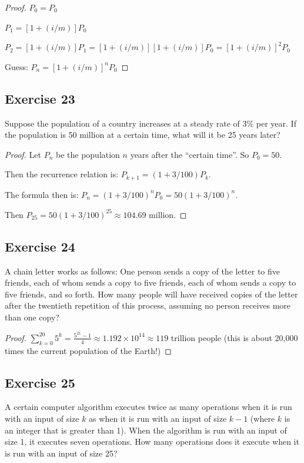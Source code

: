 \documentclass[14pt]{extarticle}
\newcommand{\dps}{\displaystyle}
\begin{document}
\begin{proof}
\(P_0 = P_0\)

\(P_1 = [1 + (i/m)] P_0\)

\(P_2 = [1 + (i/m)] P_1 = [1 + (i/m)][1 + (i/m)] P_0 = [1 + (i/m)]^2 P_0\)

Guess: \(P_n = [1 + (i/m)]^n P_0\)
\end{proof}

\subsection{Exercise 23}
Suppose the population of a country increases at a steady rate of 3\% per year. If the population is 50 million at a 
certain time, what will it be 25 years later?

\begin{proof}
Let $P_n$ be the population $n$ years after the ``certain time''. So $P_0 = 50$.

Then the recurrence relation is: \(P_{k+1} = (1 + 3/100) P_k\).

The formula then is: \(P_n = (1 + 3/100)^n P_0 = 50(1+3/100)^n\).

Then \(P_{25} = 50(1+3/100)^{25} \approx 104.69\) million.
\end{proof}

\subsection{Exercise 24}
A chain letter works as follows: One person sends a copy of the letter to five friends, each of whom sends a copy to 
five friends, each of whom sends a copy to five friends, and so forth. How many people will have received copies of 
the letter after the twentieth repetition of this process, assuming no person receives more than one copy?

\begin{proof}
\(\dps \sum_{k = 0}^{20} 5^k = \frac{5^{21} - 1}{4} \approx 1.192 \times 10^{14} \approx 119\) trillion people 
(this is about 20,000 times the current population of the Earth!)
\end{proof}

\subsection{Exercise 25}
A certain computer algorithm executes twice as many operations when it is run with an input of size $k$ as when 
it is run with an input of size $k - 1$ (where $k$ is an integer that is greater than 1). When the algorithm is run 
with an input of size 1, it executes seven operations. How many operations does it execute when it is run with an 
input of size 25?
\end{document}
